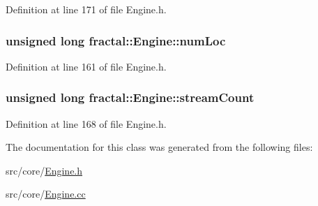 Definition at line 171 of file Engine.\+h.

\hypertarget{classfractal_1_1Engine_a161e75f37c70d201d205da9c997499ff}{
\subsubsection[{num\+Loc}]{\setlength{\rightskip}{0pt plus 5cm}unsigned long fractal\+::\+Engine\+::num\+Loc\hspace{0.3cm}{\ttfamily [protected]}}}\label{classfractal_1_1Engine_a161e75f37c70d201d205da9c997499ff}


Definition at line 161 of file Engine.\+h.

\hypertarget{classfractal_1_1Engine_a7f804a8833e727e97624a3313afa2a82}{
\subsubsection[{stream\+Count}]{\setlength{\rightskip}{0pt plus 5cm}unsigned long fractal\+::\+Engine\+::stream\+Count\hspace{0.3cm}{\ttfamily [protected]}}}\label{classfractal_1_1Engine_a7f804a8833e727e97624a3313afa2a82}


Definition at line 168 of file Engine.\+h.



The documentation for this class was generated from the following files\+:\begin{DoxyCompactItemize}
\item 
src/core/\hyperlink{Engine_8h}{Engine.\+h}\item 
src/core/\hyperlink{Engine_8cc}{Engine.\+cc}\end{DoxyCompactItemize}
